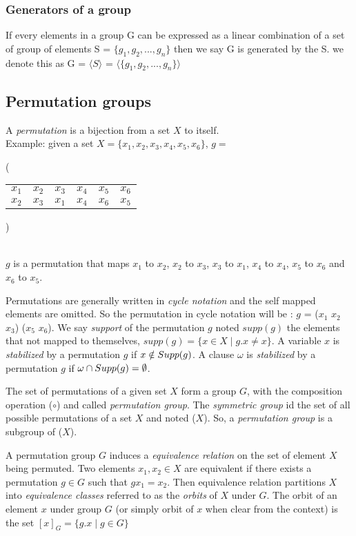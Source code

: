 \subsubsection{Generators of a group}

If every elements in a group G can be expressed as a linear combination
of a set of group of elements S = $\{g_1, g_2, ..., g_n \}$ then we say G is 
generated by the S. we denote this as G = $\langle S \rangle$ =
$\langle \{g_1, g_2, ..., g_n \} \rangle$ 



\subsection{Permutation groups}
 
A \emph{permutation} is a bijection from a set $X$ to itself.\\
 Example: given a set $X = \{x_1, x_2, x_3, x_4, x_5, x_6\}$,
$g = ${\Bigg( \begin{tabular}{cccccc}
		$x_1$ & $x_2$ & $x_3$ & $x_4$ & $x_5$ & $x_6$\\
		$x_2$ & $x_3$ & $x_1$ & $x_4$ & $x_6$ & $x_5$
	\end{tabular} \Bigg)}\\
$g$ is a permutation that maps $x_1$ to $x_2$, $x_2$ to $x_3$, $x_3$ to $x_1$, $x_4$ to $x_4$, $x_5$ to $x_6$ and $x_6$ to $x_5$.

Permutations are generally written in \emph{cycle notation} and the self mapped elements are omitted.
So the permutation in cycle notation will be : $g$ = ($x_1$ $x_2$ $x_3$) ($x_5$ $x_6$).
We say \emph{support} of the permutation $g$ noted $supp(g)$ the elements that not mapped to themselves,
$supp(g) = \{ x \in X \mid g.x \neq x\}$. A variable $x$ is \emph{stabilized} by a permutation $g$ 
if $x \notin Supp(g)$. A clause $\omega$ is \emph{stabilized} by a permutation $g$ if 
$\omega \cap Supp(g) = \emptyset$. 


The set of permutations of a given set $X$ form a group $G$,
with the composition operation ($\circ$) and called \emph{permutation group}.
The \emph{symmetric group} id the set of all possible permutations of a set $X$ and noted \Group($X$).
So, a \emph{permutation group} is a subgroup of \Group($X$). 


A permutation group $G$ induces a \emph{equivalence relation} on the set of element $X$ being
permuted. Two elements $x_1, x_2 \in X$ are equivalent if there exists a permutation $g \in G$ such that
$g x_1 = x_2$. Then equivalence relation partitions $X$ into \emph{equivalence classes} referred to
as the \emph{orbits} of $X$ under $G$. The orbit of an element $x$ under group $G$ (or simply orbit of $x$ when clear
from the context) is the set $[x]_G = \{g.x \mid g \in G\}$




